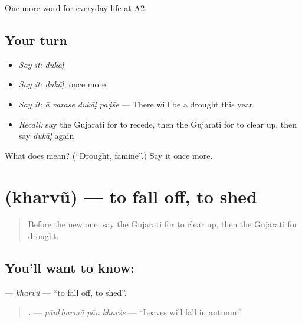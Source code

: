 \begin{grammarlens}[title={What you've built}]
One more word for everyday life at A2.
\end{grammarlens}

\subsection*{Your turn}
\begin{itemize}
\raggedright
  \item \emph{Say it:} \emph{dukāḷ}
  \item \emph{Say it:} \emph{dukāḷ}, once more
  \item \emph{Say it:} \emph{ā varase dukāḷ paḍśe} — There will be a drought this year.
  \item \emph{Recall:} say the Gujarati for to recede, then the Gujarati for to clear up, then say \emph{dukāḷ} again
\end{itemize}

\begin{tcolorbox}[breakable,colback=teal!4,colframe=teal!35!black,title={Before you move on}]
What does  mean? (\textquotedblleft{}Drought, famine\textquotedblright{}.) Say it once more.
\end{tcolorbox}
\section[\texorpdfstring{\gu{ખરવું} (kharvũ)}{ખરવું (kharvũ)}]{ (kharvũ) — to fall off, to shed}

\label{lesson:GU-C221-kharvu}



\begin{quote}
Before the new one: say the Gujarati for to clear up, then the Gujarati for drought.
\end{quote}

\subsection*{You'll want to know: }
\textbf{} — \emph{kharvũ} — \textquotedblleft{}to fall off, to shed\textquotedblright{}.

\begin{quote}
\textbf{  .} — \emph{pānkharmā̃ pān kharśe} — \textquotedblleft{}Leaves will fall in autumn.\textquotedblright{}
\end{quote}


